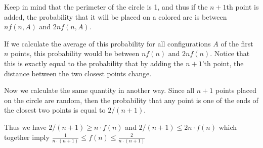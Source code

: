 \begin{solution}
Keep in mind that the perimeter of the circle is 1, and thus if the $n+1$th point is added, the probability that it will be placed on a colored arc is between
$n f(n,A)$
and
$2nf(n,A)$.

If we calculate the average of this probability for all configurations $A$ of the first $n$ points, this probability would be between
$nf(n)$
and $2nf(n)$.  Notice that this is exactly equal to the probability that by adding the $n+1$'th point, the distance between the two closest points change.

Now we calculate the same quantity in another way.
Since all $n+1$ points placed on the circle are random, then the probability that any point is one of the ends of the closest two points is equal to
$2/(n+1)$.

Thus we have $2/(n+1) \geq n\cdot f(n)$ and $2/(n+1) \leq 2n\cdot f(n)$ which together imply $\frac{1}{n\cdot(n+1)} \leq f(n) \leq \frac{2}{n\cdot(n+1)}$

\end{solution}